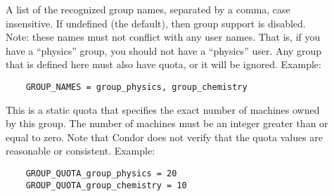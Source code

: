 \begin{description}
  
\item[]
    A list of the recognized group names, separated by a comma,
	case insensitive.  If undefined (the default), then group support
	is disabled.  Note: these names must not conflict with any
	user names. That is, if you have a ``physics'' group, you should
    not have a ``physics'' user.  Any group that is defined here must
    also have quota, or it will be ignored. Example: 
\begin{verbatim}
    GROUP_NAMES = group_physics, group_chemistry 
\end{verbatim}

\item[]
    This is a static quota that specifies the exact number of machines
	owned by this group.  The number of machines must be an integer
	greater than or equal to zero. Note that Condor does not verify
	that the quota values are reasonable or consistent.  
    Example:

\begin{verbatim}
    GROUP_QUOTA_group_physics = 20
    GROUP_QUOTA_group_chemistry = 10
\end{verbatim}

%
%





\end{description}

